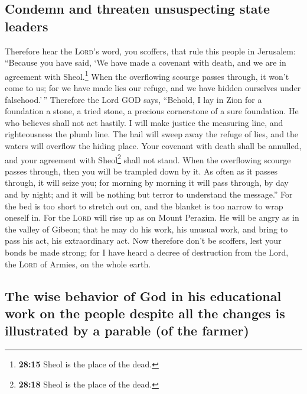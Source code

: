\hypertarget{condemn-and-threaten-unsuspecting-state-leaders}{%
\subsection{Condemn and threaten unsuspecting state
leaders}\label{condemn-and-threaten-unsuspecting-state-leaders}}

 Therefore hear the \textsc{Lord}'s word, you scoffers,
that rule this people in Jerusalem:  ``Because you have
said, `We have made a covenant with death, and we are in agreement with
Sheol.\footnote{\textbf{28:15} Sheol is the place of the dead.} When the
overflowing scourge passes through, it won't come to us; for we have
made lies our refuge, and we have hidden ourselves under falsehood.'\,''
 Therefore the Lord GOD says, ``Behold, I lay in Zion for
a foundation a stone, a tried stone, a precious cornerstone of a sure
foundation. He who believes shall not act hastily.  I
will make justice the measuring line, and righteousness the plumb line.
The hail will sweep away the refuge of lies, and the waters will
overflow the hiding place.  Your covenant with death
shall be annulled, and your agreement with Sheol\footnote{\textbf{28:18}
  Sheol is the place of the dead.} shall not stand. When the overflowing
scourge passes through, then you will be trampled down by it.
 As often as it passes through, it will seize you; for
morning by morning it will pass through, by day and by night; and it
will be nothing but terror to understand the message.'' 
For the bed is too short to stretch out on, and the blanket is too
narrow to wrap oneself in.  For the \textsc{Lord} will
rise up as on Mount Perazim. He will be angry as in the valley of
Gibeon; that he may do his work, his unusual work, and bring to pass his
act, his extraordinary act.  Now therefore don't be
scoffers, lest your bonds be made strong; for I have heard a decree of
destruction from the Lord, the \textsc{Lord} of Armies, on the whole
earth.

\hypertarget{the-wise-behavior-of-god-in-his-educational-work-on-the-people-despite-all-the-changes-is-illustrated-by-a-parable-of-the-farmer}{%
\subsection{The wise behavior of God in his educational work on the
people despite all the changes is illustrated by a parable (of the
farmer)}\label{the-wise-behavior-of-god-in-his-educational-work-on-the-people-despite-all-the-changes-is-illustrated-by-a-parable-of-the-farmer}}

